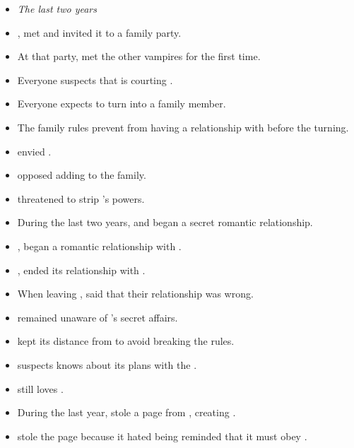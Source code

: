 \begin{itemize}
  \item[] \textit{The last two years}

  \item {},  met  and invited it to a family party.
  \item At that party,  met the other vampires for the first time.
  \item Everyone suspects that  is courting .
  \item Everyone expects  to turn  into a family member.
  \item The family rules prevent  from having a relationship with  before the turning.
  \item {} envied .
  \item {} opposed adding  to the family.
  \item {} threatened to strip 's powers.
  \item During the last two years,  and  began a secret romantic relationship.
  \item {},  began a romantic relationship with .
  \item {},  ended its relationship with .
  \item When leaving ,  said that their relationship was wrong.
  \item {} remained unaware of 's secret affairs.
  \item {} kept its distance from  to avoid breaking the rules.
  \item {} suspects  knows about its plans with the .
  \item {} still loves .
  \item During the last year,  stole a page from , creating .
  \item {} stole the page because it hated being reminded that it must obey .

\end{itemize}
